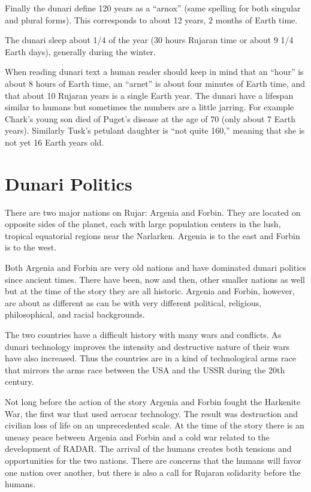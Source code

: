 Finally the dunari define 120 years as a ``arnox'' (same spelling for both singular and plural
forms). This corresponds to about 12 years, 2 months of Earth time.

The dunari sleep about 1/4 of the year (30 hours Rujaran time or about 9 1/4 Earth days),
generally during the winter.

When reading dunari text a human reader should keep in mind that an ``hour'' is about 8 hours of
Earth time, an ``arnet'' is about four minutes of Earth time, and that about 10 Rujaran years
is a single Earth year. The dunari have a lifespan similar to humans but sometimes the numbers
are a little jarring. For example Chark's young son died of Puget's disease at the age of 70
(only about 7 Earth years). Similarly Tusk's petulant daughter is ``not quite 160,'' meaning
that she is not yet 16 Earth years old.


\section{Dunari Politics}

There are two major nations on Rujar: Argenia and Forbin. They are located on opposite sides
of the planet, each with large population centers in the lush, tropical equatorial regions near
the Narlarken. Argenia is to the east and Forbin is to the west.

Both Argenia and Forbin are very old nations and have dominated dunari politics since ancient
times. There have been, now and then, other smaller nations as well but at the time of the story
they are all historic. Argenia and Forbin, however, are about as different as can be with very
different political, religious, philosophical, and racial backgrounds.

The two countries have a difficult history with many wars and conflicts. As dunari technology
improves the intensity and destructive nature of their wars have also increased. Thus the
countries are in a kind of technological arms race that mirrors the arms race between the USA
and the USSR during the 20th century.

Not long before the action of the story Argenia and Forbin fought the Harkenite War, the first
war that used aerocar technology. The result was destruction and civilian loss of life on an
unprecedented scale. At the time of the story there is an uneasy peace between Argenia and
Forbin and a cold war related to the development of RADAR. The arrival of the humans creates
both tensions and opportunities for the two nations. There are concerns that the humans will
favor one nation over another, but there is also a call for Rujaran solidarity before the
humans.

